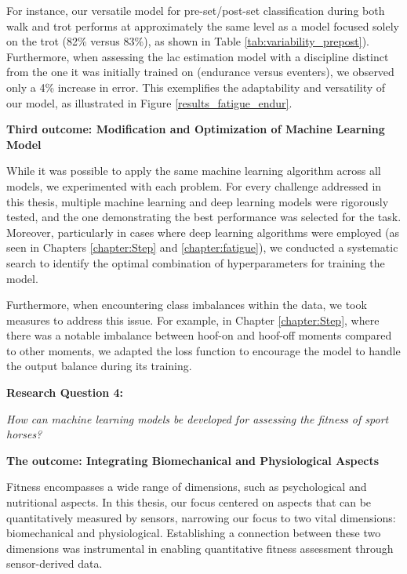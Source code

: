 For instance, our versatile model for pre-\gls{set}/post-\gls{set} classification during both walk and trot performs at approximately the same level as a model focused solely on the trot (82\% versus 83\%), as shown in Table \ref{tab:variability_prepost}). Furthermore, when assessing the \gls{lac} estimation model with a discipline distinct from the one it was initially trained on (endurance versus eventers), we observed only a 4\% increase in error. This exemplifies the adaptability and versatility of our model, as illustrated in Figure \ref{results_fatigue_endur}.


\vspace{0.15cm}

\noindent\textbf{Third outcome: Modification and Optimization of Machine Learning Model}

While it was possible to apply the same machine learning algorithm across all models, we experimented with each problem. For every challenge addressed in this thesis, multiple machine learning and deep learning models were rigorously tested, and the one demonstrating the best performance was selected for the task. Moreover, particularly in cases where deep learning algorithms were employed (as seen in Chapters \ref{chapter:Step} and \ref{chapter:fatigue}), we conducted a systematic search to identify the optimal combination of hyperparameters for training the model.

Furthermore, when encountering class imbalances within the data, we took measures to address this issue. For example, in Chapter \ref{chapter:Step}, where there was a notable imbalance between hoof-on and hoof-off moments compared to other moments, we adapted the loss function to encourage the model to handle the output balance during its training.

\vspace{0.3cm}

\noindent\textbf{\large Research Question 4:}

\textit{How can machine learning models be developed for assessing the fitness of sport
horses?}

\vspace{0.15cm}

\noindent\textbf{The outcome: Integrating Biomechanical and Physiological Aspects}

Fitness encompasses a wide range of dimensions, such as psychological and nutritional aspects. In this thesis, our focus centered on aspects that can be quantitatively measured by sensors, narrowing our focus to two vital dimensions: biomechanical and physiological. Establishing a connection between these two dimensions was instrumental in enabling quantitative fitness assessment through sensor-derived data.


